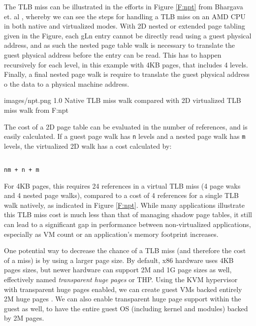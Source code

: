 The TLB miss can be illustrated in the efforts in Figure \ref{F:npt} from Bhargava et. al \cite{bhargava2008npt}, whereby we can see the steps for handling a TLB miss on an AMD CPU in both native and virtualized modes. With 2D nested or extended page tabling given in the Figure, each gLn entry cannot be directly read using a guest physical address, and as such the nested page table walk is necessary to translate the guest physical address before the entry can be read. This has to happen recursively for each level, in this example with 4KB pages, that includes 4 levels. Finally, a final nested page walk is require to translate the guest physical address o the data to a physical machine address.  

  {images/npt.png}
  {1.0}
  {Native TLB miss walk compared with 2D virtualized TLB miss walk from \cite{bhargava2008npt} }
  {F:npt}


The cost of a 2D page table can be evaluated in the number of references, and is easily calculated. If a guest page walk has \verb|n| levels and a nested page walk has \verb|m| levels, the virtualized 2D walk has a cost calculated by:
 
\begin{verbatim}

nm + n + m
\end{verbatim}


For 4KB pages, this requires 24 references in a virtual TLB miss (4 page waks and 4 nested page walks), compared to a cost of 4 references for a single TLB walk natively, as indicated in Figure \ref{F:npt}. While many applications illustrate this TLB miss cost is much less than that of managing shadow page tables, it still can lead to a significant gap in performance between non-virtualized applications, especially as VM count or an application's memory footprint increases. 

One potential way to decrease the chance of a TLB miss (and therefore the cost of a miss) is by using a larger page size. By default, x86 hardware uses 4KB pages sizes, but newer hardware can support 2M and 1G page sizes as well, effectively named \emph{transparent huge pages} or THP.  Using the KVM hypervisor with transparent huge pages enabled, we can create guest VMs backed entirely 2M huge pages \cite{Arcangeli:2010}. We can also enable transparent huge page support within the guest as well, to have the entire guest OS (including kernel and modules) backed by 2M pages. 

